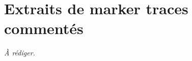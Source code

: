 \chapter{Extraits de marker traces comment\'es}\label{annexe:marker-traces}


\textit{\`A r\'ediger.}
